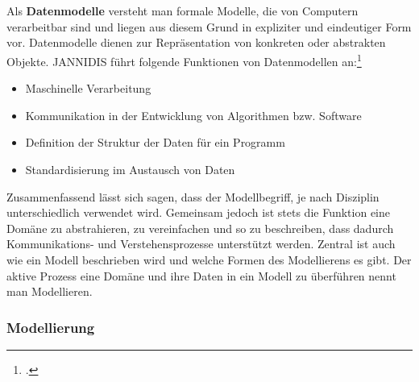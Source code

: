 \documentclass[12pt,a4paper]{article}
\begin{document}
\\
\\
Als \textbf{Datenmodelle} versteht man formale Modelle, die von Computern verarbeitbar sind und liegen aus diesem Grund in expliziter und eindeutiger Form vor. Datenmodelle dienen zur Repräsentation von konkreten oder abstrakten Objekte. JANNIDIS führt folgende Funktionen von Datenmodellen an:\footcite[][S.99-100]{jannidis2017grundlagen}
\begin{itemize}
\item Maschinelle Verarbeitung
\item Kommunikation in der Entwicklung von Algorithmen bzw. Software
\item Definition der Struktur der Daten für ein Programm
\item Standardisierung im Austausch von Daten
\end{itemize}
Zusammenfassend lässt sich sagen, dass der Modellbegriff, je nach Disziplin unterschiedlich verwendet wird. Gemeinsam jedoch ist stets die Funktion eine Domäne zu abstrahieren, zu vereinfachen und so zu beschreiben, dass dadurch Kommunikations- und Verstehensprozesse unterstützt werden. Zentral ist auch wie ein Modell beschrieben wird und welche Formen des Modellierens es gibt. Der aktive Prozess eine Domäne und ihre Daten in ein Modell zu überführen nennt man Modellieren.

\subsubsection{Modellierung}
\label{Modellierung}
\end{document}
